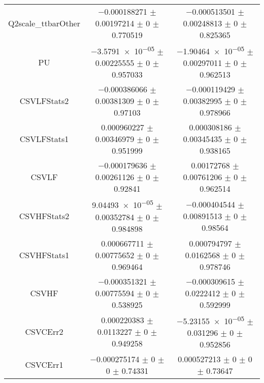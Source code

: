 \begin{table}
\begin{tabular}{ccc}
Q2scale\_ttbarOther & \num{-0.000188271} $\pm$ \num{0.00197214} $\pm$ \num{0} $\pm$ \num{0.770519} & \num{-0.000513501} $\pm$ \num{0.00248813} $\pm$ \num{0} $\pm$ \num{0.825365}\\
PU & \num{-3.5791e-05} $\pm$ \num{0.00225555} $\pm$ \num{0} $\pm$ \num{0.957033} & \num{-1.90464e-05} $\pm$ \num{0.00297011} $\pm$ \num{0} $\pm$ \num{0.962513}\\
CSVLFStats2 & \num{-0.000386066} $\pm$ \num{0.00381309} $\pm$ \num{0} $\pm$ \num{0.97103} & \num{-0.000119429} $\pm$ \num{0.00382995} $\pm$ \num{0} $\pm$ \num{0.978966}\\
CSVLFStats1 & \num{0.000960227} $\pm$ \num{0.00346979} $\pm$ \num{0} $\pm$ \num{0.951999} & \num{0.000308186} $\pm$ \num{0.00345435} $\pm$ \num{0} $\pm$ \num{0.938165}\\
CSVLF & \num{-0.000179636} $\pm$ \num{0.00261126} $\pm$ \num{0} $\pm$ \num{0.92841} & \num{0.00172768} $\pm$ \num{0.00761206} $\pm$ \num{0} $\pm$ \num{0.962514}\\
CSVHFStats2 & \num{9.04493e-05} $\pm$ \num{0.00352784} $\pm$ \num{0} $\pm$ \num{0.984898} & \num{-0.000404544} $\pm$ \num{0.00891513} $\pm$ \num{0} $\pm$ \num{0.98564}\\
CSVHFStats1 & \num{0.000667711} $\pm$ \num{0.00775652} $\pm$ \num{0} $\pm$ \num{0.969464} & \num{0.000794797} $\pm$ \num{0.0162568} $\pm$ \num{0} $\pm$ \num{0.978746}\\
CSVHF & \num{-0.000351321} $\pm$ \num{0.00775594} $\pm$ \num{0} $\pm$ \num{0.538925} & \num{-0.000309615} $\pm$ \num{0.0222412} $\pm$ \num{0} $\pm$ \num{0.592999}\\
CSVCErr2 & \num{0.000220383} $\pm$ \num{0.0113227} $\pm$ \num{0} $\pm$ \num{0.949258} & \num{-5.23155e-05} $\pm$ \num{0.031296} $\pm$ \num{0} $\pm$ \num{0.952856}\\
CSVCErr1 & \num{-0.000275174} $\pm$ \num{0} $\pm$ \num{0} $\pm$ \num{0.74331} & \num{0.000527213} $\pm$ \num{0} $\pm$ \num{0} $\pm$ \num{0.73647}\\
\bottomrule
\end{tabular}
\end{table}